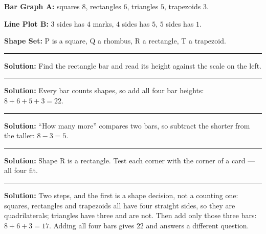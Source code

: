 \documentclass[12pt]{article}
\begin{document}


\noindent\textbf{Bar Graph A:} squares $8$, rectangles $6$, triangles $5$, trapezoids $3$.\par
\noindent\textbf{Line Plot B:} $3$ sides has $4$ marks, $4$ sides has $5$, $5$ sides has $1$.\par
\noindent\textbf{Shape Set:} P is a square, Q a rhombus, R a rectangle, T a trapezoid.

\vspace{0.15cm}\noindent\rule{\linewidth}{0.4pt}


\textbf{Solution:} Find the rectangle bar and read its height against the scale on the left. 

\vspace{0.12cm}\noindent\rule{\linewidth}{0.2pt}


\textbf{Solution:} Every bar counts shapes, so add all four bar heights:
$8 + 6 + 5 + 3 = 22$. 

\vspace{0.12cm}\noindent\rule{\linewidth}{0.2pt}


\textbf{Solution:} ``How many more'' compares two bars, so subtract the shorter from the taller:
$8 - 3 = 5$. 

\vspace{0.12cm}\noindent\rule{\linewidth}{0.2pt}


\textbf{Solution:} Shape R is a rectangle. Test each corner with the corner of a card --- all four
fit. 

\vspace{0.12cm}\noindent\rule{\linewidth}{0.2pt}


\textbf{Solution:} Two steps, and the first is a shape decision, not a counting one: squares,
rectangles and trapezoids all have four straight sides, so they are quadrilaterals; triangles have
three and are not. Then add only those three bars: $8 + 6 + 3 = 17$. Adding all four bars gives $22$
and answers a different question. 
\end{document}
